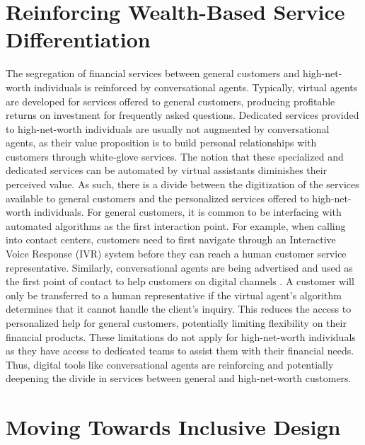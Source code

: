 \documentclass{sigchi-ext}
\begin{document}
\section{Reinforcing Wealth-Based Service Differentiation}

The segregation of financial services between general customers and high-net-worth individuals is reinforced by conversational agents. %
Typically, virtual agents are developed for services offered to general customers, producing profitable returns on investment for frequently asked questions. Dedicated services provided to high-net-worth individuals are usually not augmented by conversational agents, as their value proposition is to build personal relationships with customers through white-glove services. The notion that these specialized and dedicated services can be automated by virtual assistants diminishes their perceived value. As such, there is a divide between the digitization of the services available to general customers and the personalized services offered to high-net-worth individuals. For general customers, it is common to be interfacing with automated algorithms as the first interaction point. For example, when calling into contact centers, customers need to first navigate through an Interactive Voice Response (IVR) system before they can reach a human customer service representative. Similarly, conversational agents are being advertised and used as the first point of contact to help customers on digital channels \cite{revechat}. A customer will only be transferred to a human representative if the virtual agent's algorithm determines that it cannot handle the client's inquiry. This reduces the access to personalized help for general customers, potentially limiting flexibility on their financial products. These limitations do not apply for high-net-worth individuals as they have access to dedicated teams to assist them with their financial needs. Thus, digital tools like conversational agents are reinforcing and potentially deepening the divide in services between general and high-net-worth customers.


\section{Moving Towards Inclusive Design}
\end{document}
